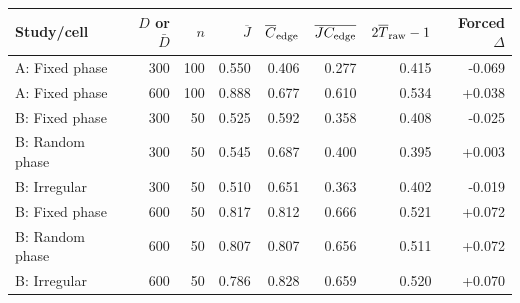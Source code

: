 \begin{tabular}{lrrrrrrr}
\toprule
Study/cell & $D$ or $\bar D$ & $n$ & $\overline J$ & $\overline C_{\rm edge}$ & $\overline{JC_{\rm edge}}$ & $2\overline T_{\rm raw}-1$ & Forced $\Delta$ \\
\midrule
A: Fixed phase & 300 & 100 & 0.550 & 0.406 & 0.277 & 0.415 & -0.069 \\
A: Fixed phase & 600 & 100 & 0.888 & 0.677 & 0.610 & 0.534 & +0.038 \\
B: Fixed phase & 300 & 50 & 0.525 & 0.592 & 0.358 & 0.408 & -0.025 \\
B: Random phase & 300 & 50 & 0.545 & 0.687 & 0.400 & 0.395 & +0.003 \\
B: Irregular & 300 & 50 & 0.510 & 0.651 & 0.363 & 0.402 & -0.019 \\
B: Fixed phase & 600 & 50 & 0.817 & 0.812 & 0.666 & 0.521 & +0.072 \\
B: Random phase & 600 & 50 & 0.807 & 0.807 & 0.656 & 0.511 & +0.072 \\
B: Irregular & 600 & 50 & 0.786 & 0.828 & 0.659 & 0.520 & +0.070 \\
\bottomrule
\end{tabular}
